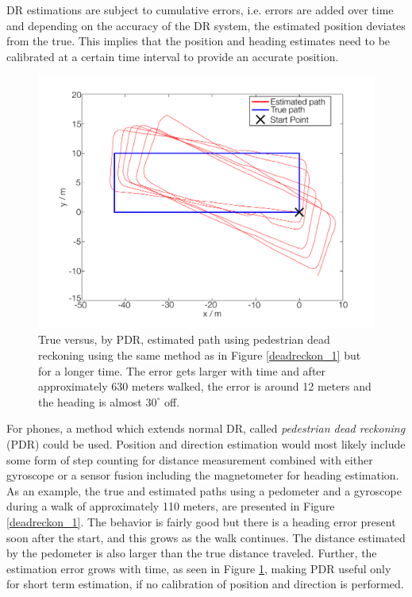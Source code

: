 \documentclass{LTHthesis}
\begin{document}
DR estimations are subject to cumulative errors, i.e. errors are added over time and depending on the accuracy of the DR system, the estimated position deviates from the true. This implies that the position and heading estimates need to be calibrated at a certain time interval to provide an accurate position.
%
\begin{figure}[!hbt]

\includegraphics[width=1\textwidth ]{images/kinematic/deadreckon_2}
\caption{True versus, by PDR, estimated path using pedestrian dead reckoning using the same method as in Figure \ref{deadreckon_1} but for a longer time. The error gets larger with time and after approximately 630 meters walked, the error is around 12 meters and the heading is almost $30^\circ$ off.}\label{deadreckon_2}
\end{figure}
%
For phones, a method which extends normal DR, called \emph{pedestrian dead reckoning} (PDR) could be used. Position and direction estimation would most likely include some form of step counting for distance measurement combined with either gyroscope or a sensor fusion including the magnetometer for heading estimation. As an example, the true and estimated paths using a pedometer and a gyroscope during a walk of approximately 110 meters, are presented in Figure \ref{deadreckon_1}. The behavior is fairly good but there is a heading error present soon after the start, and this grows as the walk continues. The distance estimated by the pedometer is also larger than the true distance traveled. Further, the estimation error grows with time, as seen in Figure \ref{deadreckon_2}, making PDR useful only for short term estimation, if no calibration of position and direction is performed.  
%
\end{document}
